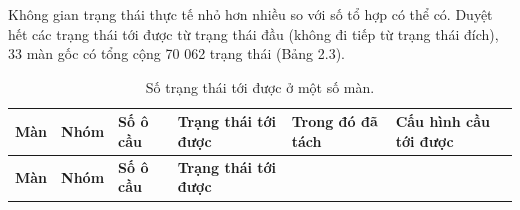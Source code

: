 Không gian trạng thái thực tế nhỏ hơn nhiều so với số tổ hợp có thể có. Duyệt hết các trạng thái tới được từ trạng thái đầu (không đi tiếp từ trạng thái đích), 33 màn gốc có tổng cộng 70 062 trạng thái (Bảng 2.3).

\begin{longtable}[]{@{}
  >{\raggedright\arraybackslash}p{}
  >{\raggedright\arraybackslash}p{}
  >{\raggedright\arraybackslash}p{}
  >{\raggedright\arraybackslash}p{}
  >{\raggedright\arraybackslash}p{}
  >{\raggedright\arraybackslash}p{}@{}}
\caption{ Số trạng thái tới được ở một số màn.}\tabularnewline
\toprule\noalign{}
\rowcolor{tablehead}\begin{minipage}[b]{\linewidth}\raggedright
\textbf{Màn}
\end{minipage} & \begin{minipage}[b]{\linewidth}\raggedright
\textbf{Nhóm}
\end{minipage} & \begin{minipage}[b]{\linewidth}\raggedright
\textbf{Số ô cầu}
\end{minipage} & \begin{minipage}[b]{\linewidth}\raggedright
\textbf{Trạng thái tới được}
\end{minipage} & \begin{minipage}[b]{\linewidth}\raggedright
\textbf{Trong đó đã tách}
\end{minipage} & \begin{minipage}[b]{\linewidth}\raggedright
\textbf{Cấu hình cầu tới được}
\end{minipage} \\
\midrule\noalign{}
\endfirsthead
\toprule\noalign{}
\rowcolor{tablehead}\begin{minipage}[b]{\linewidth}\raggedright
\textbf{Màn}
\end{minipage} & \begin{minipage}[b]{\linewidth}\raggedright
\textbf{Nhóm}
\end{minipage} & \begin{minipage}[b]{\linewidth}\raggedright
\textbf{Số ô cầu}
\end{minipage} & \begin{minipage}[b]{\linewidth}\raggedright
\textbf{Trạng thái tới được}

\end{minipage}
\end{longtable}
